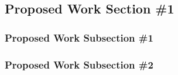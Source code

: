 
\subsection{Proposed Work Section \#1}

\subsubsection{Proposed Work Subsection \#1}
\blindtext

\subsubsection{Proposed Work Subsection \#2}
\blindtext
\blindtext

